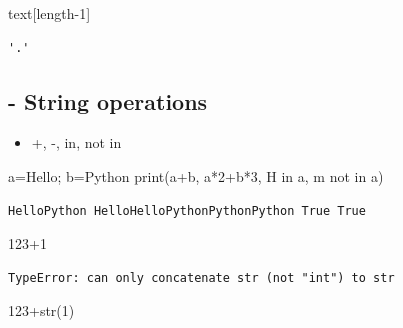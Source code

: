 \documentclass[
  letterpaper,
  DIV=11,
  numbers=noendperiod]{scrreprt}
\newenvironment{Shaded}{\begin{snugshade}}{\end{snugshade}}
\newcommand{\BuiltInTok}[1]{\textcolor[rgb]{0.00,0.23,0.31}{#1}}
\newcommand{\CommentTok}[1]{\textcolor[rgb]{0.37,0.37,0.37}{#1}}
\newcommand{\DecValTok}[1]{\textcolor[rgb]{0.68,0.00,0.00}{#1}}
\newcommand{\KeywordTok}[1]{\textcolor[rgb]{0.00,0.23,0.31}{#1}}
\newcommand{\NormalTok}[1]{\textcolor[rgb]{0.00,0.23,0.31}{#1}}
\newcommand{\OperatorTok}[1]{\textcolor[rgb]{0.37,0.37,0.37}{#1}}
\newcommand{\StringTok}[1]{\textcolor[rgb]{0.13,0.47,0.30}{#1}}
\providecommand{\tightlist}{%
  \setlength{\itemsep}{0pt}\setlength{\parskip}{0pt}}\usepackage{longtable,booktabs,array}
\begin{document}
\begin{Shaded}
\begin{Highlighting}[]
\NormalTok{text[length}\OperatorTok{{-}}\DecValTok{1}\NormalTok{]}
\end{Highlighting}
\end{Shaded}

\begin{verbatim}
'.'
\end{verbatim}

\subsection{- String operations}\label{string-operations}

\begin{itemize}
\tightlist
\item
  +, -, in, not in
\end{itemize}

\begin{Shaded}
\begin{Highlighting}[]
\NormalTok{a}\OperatorTok{=}\StringTok{\textquotesingle{}Hello\textquotesingle{}}\OperatorTok{;}\NormalTok{ b}\OperatorTok{=}\StringTok{\textquotesingle{}Python\textquotesingle{}}
\BuiltInTok{print}\NormalTok{(a}\OperatorTok{+}\NormalTok{b, a}\OperatorTok{*}\DecValTok{2}\OperatorTok{+}\NormalTok{b}\OperatorTok{*}\DecValTok{3}\NormalTok{, }\StringTok{\textquotesingle{}H\textquotesingle{}} \KeywordTok{in}\NormalTok{ a, }\StringTok{\textquotesingle{}m\textquotesingle{}} \KeywordTok{not} \KeywordTok{in}\NormalTok{ a)}
\end{Highlighting}
\end{Shaded}

\begin{verbatim}
HelloPython HelloHelloPythonPythonPython True True
\end{verbatim}

\begin{Shaded}
\begin{Highlighting}[]
\CommentTok{\textquotesingle{}123\textquotesingle{}}\OperatorTok{+}\DecValTok{1}
\end{Highlighting}
\end{Shaded}

\begin{verbatim}
TypeError: can only concatenate str (not "int") to str
\end{verbatim}

\begin{Shaded}
\begin{Highlighting}[]
\CommentTok{\textquotesingle{}123\textquotesingle{}}\OperatorTok{+}\BuiltInTok{str}\NormalTok{(}\DecValTok{1}\NormalTok{)}
\end{Highlighting}
\end{Shaded}
\end{document}
